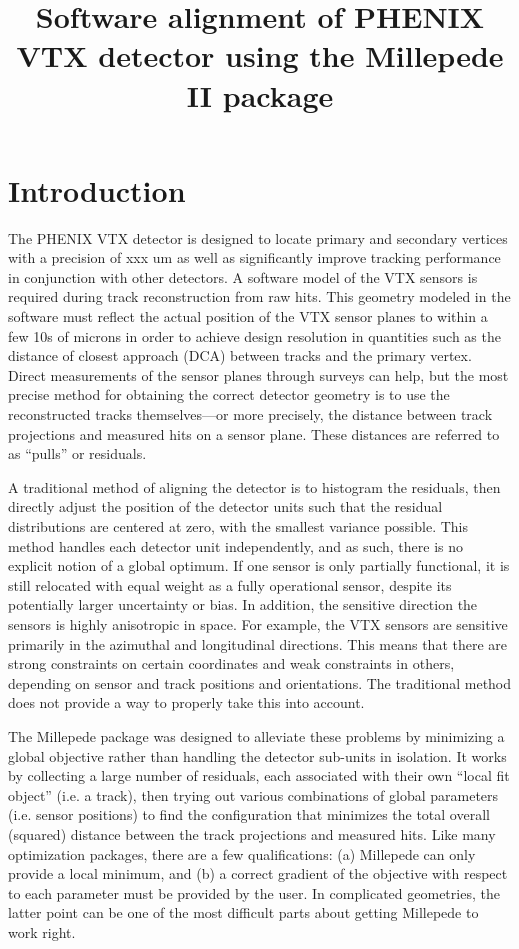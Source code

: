 \documentclass[12pt]{article}
\title{\sffamily\bfseries{Software alignment of PHENIX VTX detector using the Millepede II package}}
\author{\sffamily{Andrew Adare, Darren McGlinchey, Jin Huang, Jamie Nagle}}
\date{\sffamily{\today}}
\begin{document}
\maketitle
\section{Introduction}
The PHENIX VTX detector is designed to locate primary and secondary vertices with a precision of xxx um as well as significantly improve tracking performance in conjunction with other detectors. A software model of the VTX sensors is required during track reconstruction from raw hits. This geometry modeled in the software must reflect the actual position of the VTX sensor planes to within a few 10s of microns in order to achieve design resolution in quantities such as the distance of closest approach (DCA) between tracks and the primary vertex. Direct measurements of the sensor planes through surveys can help, but the most precise method for obtaining the correct detector geometry is to use the reconstructed tracks themselves---or more precisely, the distance between track projections and measured hits on a sensor plane. These distances are referred to as ``pulls'' or residuals.

A traditional method of aligning the detector is to histogram the residuals, then directly adjust the position of the detector units such that the residual distributions are centered at zero, with the smallest variance possible. This method handles each detector unit independently, and as such, there is no explicit notion of a global optimum. If one sensor is only partially functional, it is still relocated with equal weight as a fully operational sensor, despite its potentially larger uncertainty or bias. In addition, the sensitive direction the sensors is highly anisotropic in space. For example, the VTX sensors are sensitive primarily in the azimuthal and longitudinal directions. This means that there are strong constraints on certain coordinates and weak constraints in others, depending on sensor and track positions and orientations. The traditional method does not provide a way to properly take this into account.

The Millepede package was designed to alleviate these problems by minimizing a global objective rather than handling the detector sub-units in isolation. It works by collecting a large number of residuals, each associated with their own ``local fit object'' (i.e. a track), then trying out various combinations of global parameters (i.e. sensor positions) to find the configuration that minimizes the total overall (squared) distance between the track projections and measured hits. Like many optimization packages, there are a few qualifications: (a) Millepede can only provide a local minimum, and (b) a correct gradient of the objective with respect to each parameter must be provided by the user. In complicated geometries, the latter point can be one of the most difficult parts about getting Millepede to work right.
\end{document}

